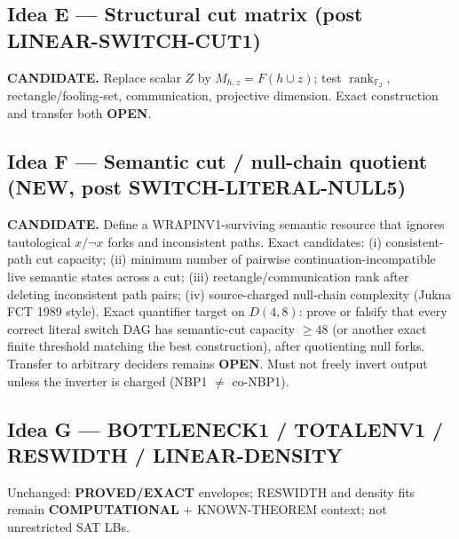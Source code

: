 \documentclass[11pt]{article}
\begin{document}
\subsection*{Idea E --- Structural cut matrix (post LINEAR-SWITCH-CUT1)}
\textbf{CANDIDATE.} Replace scalar $Z$ by $M_{h,z}=F(h\cup z)$; test
$\operatorname{rank}_{\mathbb F_2}$, rectangle/fooling-set, communication, projective dimension.
Exact construction and transfer both \textbf{OPEN}.

\subsection*{Idea F --- Semantic cut / null-chain quotient (NEW, post SWITCH-LITERAL-NULL5)}
\textbf{CANDIDATE.} Define a WRAPINV1-surviving semantic resource that ignores tautological
$x/\neg x$ forks and inconsistent paths. Exact candidates:
(i) consistent-path cut capacity;
(ii) minimum number of pairwise continuation-incompatible live semantic states across a cut;
(iii) rectangle/communication rank after deleting inconsistent path pairs;
(iv) source-charged null-chain complexity (Jukna FCT 1989 style).
Exact quantifier target on $D(4,8)$:
prove or falsify that every correct literal switch DAG has semantic-cut capacity $\ge 48$
(or another exact finite threshold matching the best construction), after quotienting
null forks. Transfer to arbitrary deciders remains \textbf{OPEN}.
Must not freely invert output unless the inverter is charged (NBP1 $\neq$ co-NBP1).

\subsection*{Idea G --- BOTTLENECK1 / TOTALENV1 / RESWIDTH / LINEAR-DENSITY}
Unchanged: \textbf{PROVED/EXACT} envelopes; RESWIDTH and density fits remain
\textbf{COMPUTATIONAL} + KNOWN-THEOREM context; not unrestricted SAT LBs.
\end{document}
